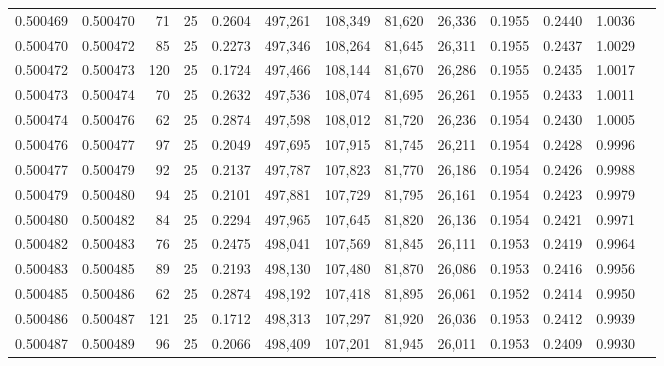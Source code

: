 \begin{tabular}{rrrrrrrrrrrrr}
0.500469 & 0.500470 &  71 &  25 &                                     0.2604 & 497,261 & 108,349 &  81,620 &  26,336 & 0.1955 & 0.2440 & 1.0036 \\
0.500470 & 0.500472 &  85 &  25 &                                     0.2273 & 497,346 & 108,264 &  81,645 &  26,311 & 0.1955 & 0.2437 & 1.0029 \\
0.500472 & 0.500473 & 120 &  25 &                                     0.1724 & 497,466 & 108,144 &  81,670 &  26,286 & 0.1955 & 0.2435 & 1.0017 \\
0.500473 & 0.500474 &  70 &  25 &                                     0.2632 & 497,536 & 108,074 &  81,695 &  26,261 & 0.1955 & 0.2433 & 1.0011 \\
0.500474 & 0.500476 &  62 &  25 &                                     0.2874 & 497,598 & 108,012 &  81,720 &  26,236 & 0.1954 & 0.2430 & 1.0005 \\
0.500476 & 0.500477 &  97 &  25 &                                     0.2049 & 497,695 & 107,915 &  81,745 &  26,211 & 0.1954 & 0.2428 & 0.9996 \\
0.500477 & 0.500479 &  92 &  25 &                                     0.2137 & 497,787 & 107,823 &  81,770 &  26,186 & 0.1954 & 0.2426 & 0.9988 \\
0.500479 & 0.500480 &  94 &  25 &                                     0.2101 & 497,881 & 107,729 &  81,795 &  26,161 & 0.1954 & 0.2423 & 0.9979 \\
0.500480 & 0.500482 &  84 &  25 &                                     0.2294 & 497,965 & 107,645 &  81,820 &  26,136 & 0.1954 & 0.2421 & 0.9971 \\
0.500482 & 0.500483 &  76 &  25 &                                     0.2475 & 498,041 & 107,569 &  81,845 &  26,111 & 0.1953 & 0.2419 & 0.9964 \\
0.500483 & 0.500485 &  89 &  25 &                                     0.2193 & 498,130 & 107,480 &  81,870 &  26,086 & 0.1953 & 0.2416 & 0.9956 \\
0.500485 & 0.500486 &  62 &  25 &                                     0.2874 & 498,192 & 107,418 &  81,895 &  26,061 & 0.1952 & 0.2414 & 0.9950 \\
0.500486 & 0.500487 & 121 &  25 &                                     0.1712 & 498,313 & 107,297 &  81,920 &  26,036 & 0.1953 & 0.2412 & 0.9939 \\
0.500487 & 0.500489 &  96 &  25 &                                     0.2066 & 498,409 & 107,201 &  81,945 &  26,011 & 0.1953 & 0.2409 & 0.9930 \\

\end{tabular}
